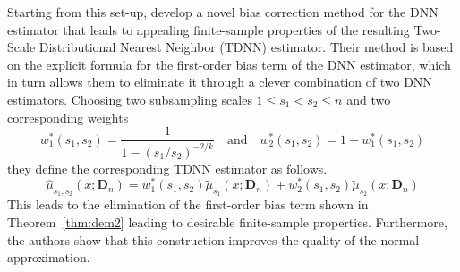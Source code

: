 Starting from this set-up, \citet{demirkaya_optimal_2024} develop a novel
bias correction method for the DNN estimator that leads to appealing
finite-sample properties of the resulting Two-Scale Distributional Nearest
Neighbor (TDNN) estimator. Their method is based on the explicit formula for
the first-order bias term of the DNN estimator, which in turn allows them to
eliminate it through a clever combination of two DNN estimators. Choosing two
subsampling scales $1 \leq s_1 < s_2 \leq n$ and two corresponding weights
\begin{equation}
	w_{1}^{*}(s_1, s_2) = \frac{1}{1-(s_1/s_2)^{-2/k}}
	\quad\text{and}\quad
	w_2^{*}(s_1, s_2) = 1 - w_{1}^{*}(s_1, s_2)
\end{equation}
they define the corresponding TDNN estimator as follows.
\begin{equation}
	\hat{\mu}_{s_1, s_2}\left(x; \mathbf{D}_n\right)
	= w_{1}^{*}(s_1, s_2)\tilde{\mu}_{s_1}\left(x; \mathbf{D}_n\right) + w_2^{*}(s_1, s_2)\tilde{\mu}_{s_2}\left(x; \mathbf{D}_n\right)
\end{equation}
This leads to the elimination of the first-order bias term shown in Theorem~\ref{thm:dem2} leading to desirable finite-sample properties.
Furthermore, the authors show that this construction improves the quality of the normal approximation.

